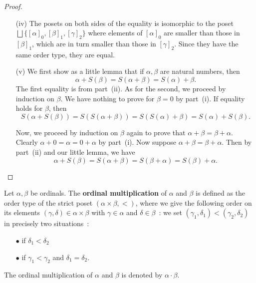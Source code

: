 \begin{proof}
\begin{itemize}
        \item[(iv)] The posets on both sides of the equality is isomorphic to the poset $\bigsqcup \{[\alpha]_0, [\beta]_1, [\gamma]_2\}$ where elements of $[\alpha]_0$ are smaller than those in $[\beta]_1$, which are in turn smaller than those in $[\gamma]_2$. Since they have the same order type, they are equal.
        \\

        \item[(v)] We first show as a little lemma that if $\alpha,\beta$ are natural numbers, then 
        \[
            \alpha + S(\beta) = S(\alpha + \beta) = S(\alpha) + \beta.     
        \]
        The first equality is from part~(ii). As for the second, we proceed by induction on $\beta$. We have nothing to prove for $\beta = 0$ by part~(i). If equality holds for $\beta$, then
        \[
            S(\alpha + S(\beta)) = S(S(\alpha + \beta)) = S(S(\alpha) + \beta) = S(\alpha) + S(\beta).     
        \]
        
        Now, we proceed by induction on $\beta$ again to prove that $\alpha + \beta = \beta + \alpha$. Clearly $\alpha + 0 = \alpha = 0 + \alpha$ by part~(i). Now suppose $\alpha + \beta = \beta + \alpha$. Then by part~(ii) and our little lemma, we have
        \[
            \alpha + S(\beta) = S(\alpha + \beta) = S(\beta + \alpha) = S(\beta) + \alpha.   
        \]
    \end{itemize}
\end{proof}

\begin{definition} \label{ordinal-multiplication}
    Let $\alpha,\beta$ be ordinals. The \textbf{ordinal multiplication} of $\alpha$ and $\beta$ is defined as the order type of the strict poset $(\alpha \times \beta, <)$, where we give the following order on its elements $(\gamma,\delta) \in \alpha \times \beta$ with $\gamma \in \alpha$ and $\delta \in \beta$~: we set $(\gamma_1, \delta_1) < (\gamma_2,\delta_2)$ in precisely two situations~:
    \\
    \begin{itemize}
        \item[$\bullet$] if $\delta_1 < \delta_2$
        \\

        \item[$\bullet$] if $\gamma_1 < \gamma_2$ and $\delta_1 = \delta_2$. 
        \\

    \end{itemize}
    The ordinal multiplication of $\alpha$ and $\beta$ is denoted by $\alpha \cdot \beta$.
    \\

\end{definition}

